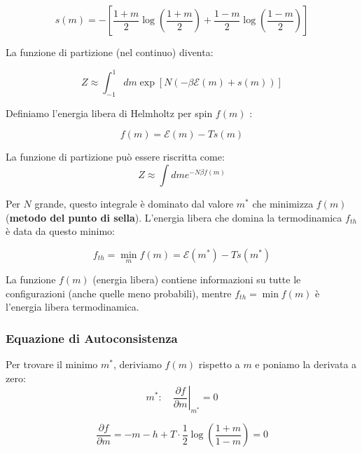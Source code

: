\begin{tcolorbox}[colback=yellow!25, colframe=yellow!75!orange, coltitle=black, title=\textbf{Equazione per Spin}]
\begin{equation}
s(m) = - \left[ \frac{1+m}{2} \log\left(\frac{1+m}{2}\right) + \frac{1-m}{2} \log\left(\frac{1-m}{2}\right) \right]
\end{equation}
\end{tcolorbox}

La funzione di partizione (nel continuo) diventa:

\begin{equation}
Z \approx \int_{-1}^{1} dm \exp\left[ N ( -\beta \mathcal{E}(m) + s(m) ) \right]
\end{equation}


Definiamo l'energia libera di Helmholtz per spin $f(m)$ :

\begin{equation}
f(m) = \mathcal{E}(m) - T s(m)
\end{equation}


La funzione di partizione può essere riscritta come: 
\begin{equation}
    Z \approx \int dm e^{ -N \beta f(m) }
\end{equation}


Per $N$ grande, questo integrale è dominato dal valore $m^*$ che minimizza $f(m)$ (\textbf{metodo del punto di sella}). L'energia libera che domina la termodinamica $f_{th}$ è data da questo minimo:

\begin{equation}
f_{th} = \min_m f(m) = \mathcal{E}(m^*) - T s(m^*)
\end{equation}

La funzione $f(m)$ (energia libera) contiene informazioni su tutte le configurazioni (anche quelle meno probabili), mentre $f_{th} = \min f(m)$ è l'energia libera termodinamica. 

\subsubsection*{Equazione di Autoconsistenza}

Per trovare il minimo $m^*$, deriviamo $f(m)$ rispetto a $m$ e poniamo la derivata a zero: 
\begin{equation*}
  m^* : \quad \left.\frac{\partial f}{\partial m}\right|_{m^*} = 0  
\end{equation*}

\begin{equation}
\frac{\partial f}{\partial m} = -m - h + T \cdot \frac{1}{2} \log\left(\frac{1+m}{1-m}\right) = 0
\end{equation}



